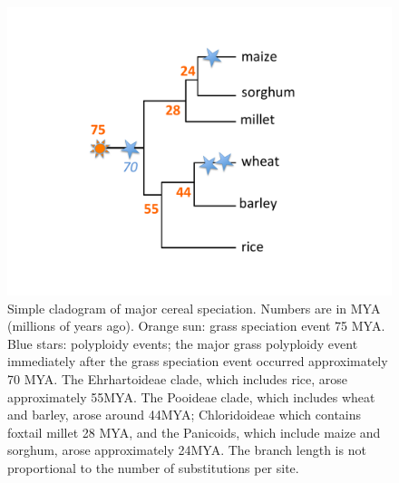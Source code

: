 \documentclass[12pt]{article}
\begin{document}
\begin{figure}[h]
    \centering
    \includegraphics[width=15cm]{Figure_1.pdf}
    \caption{Simple cladogram of major cereal speciation. Numbers are in MYA (millions of years ago).
Orange sun: grass speciation event 75 MYA.  Blue stars: polyploidy events; 
the major grass polyploidy event immediately after the grass speciation event occurred 
approximately 70 MYA. The Ehrhartoideae clade, which includes rice, arose 
approximately 55MYA. The Pooideae clade, which includes wheat and barley, 
arose around 44MYA; Chloridoideae which contains foxtail millet 28 MYA, and the Panicoids, 
which include maize and sorghum, arose approximately 24MYA. The branch length is not 
proportional to the number of substitutions per site.
}
    \label{fig:grassphylo}
\end{figure}
\end{document}
